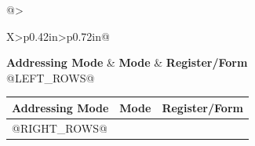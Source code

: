 \par\vspace{5pt}
\begingroup\scriptsize
\setlength{\tabcolsep}{2pt}
\setlength{\arrayrulewidth}{0.35pt}
\renewcommand{\arraystretch}{@ROW_STRETCH@}
\noindent
\begin{minipage}[t]{0.485\linewidth}
\vspace{0pt}
\begin{tabularx}{\linewidth}{@{}>{\raggedright\arraybackslash}X>{\centering\arraybackslash}p{0.42in}>{\centering\arraybackslash}p{0.72in}@{}}
\toprule
{}
\textbf{Addressing Mode} & \textbf{Mode} & \textbf{Register/Form}\\
\midrule
@LEFT_ROWS@
\bottomrule
\end{tabularx}
\end{minipage}\hfill
\begin{minipage}[t]{0.485\linewidth}
\vspace{0pt}
\begin{tabularx}{\linewidth}{@{}>{\raggedright\arraybackslash}X>{\centering\arraybackslash}p{0.42in}>{\centering\arraybackslash}p{0.72in}@{}}
\toprule
\rowcolor{BedrockHeaderFill}
\textbf{Addressing Mode} & \textbf{Mode} & \textbf{Register/Form}\\
\midrule
@RIGHT_ROWS@
\bottomrule
\end{tabularx}
\end{minipage}
\endgroup\par\vspace{@AFTER_SPACE@}
